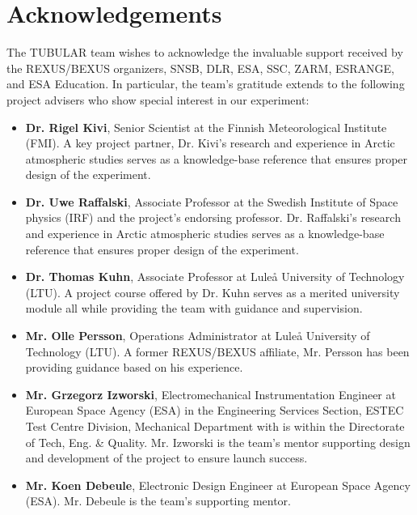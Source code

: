 \section*{Acknowledgements} \markboth{}{}

The TUBULAR team wishes to acknowledge the invaluable support received by the REXUS/BEXUS organizers, SNSB, DLR, ESA, SSC, ZARM, ESRANGE, and ESA Education. In particular, the team's gratitude extends to the following project advisers who show special interest in our experiment:

\begin{itemize}
  \item \textbf{Dr. Rigel Kivi}, Senior Scientist at the Finnish Meteorological Institute (FMI). A key project partner, Dr. Kivi's research and experience in Arctic atmospheric studies serves as a knowledge-base reference that ensures proper design of the experiment.
  \item \textbf{Dr. Uwe Raffalski}, Associate Professor at the Swedish Institute of Space physics (IRF) and the project's endorsing professor. Dr. Raffalski's research and experience in Arctic atmospheric studies serves as a knowledge-base reference that ensures proper design of the experiment.
  \item \textbf{Dr. Thomas Kuhn}, Associate Professor at Luleå  University of Technology (LTU). A project course offered by Dr. Kuhn serves as a merited university module all while providing the team with guidance and supervision.
  \item \textbf{Mr. Olle Persson}, Operations Administrator at Luleå University of Technology (LTU). A former REXUS/BEXUS affiliate, Mr. Persson has been providing guidance based on his experience.
  \item \textbf{Mr. Grzegorz Izworski}, Electromechanical Instrumentation Engineer at European Space Agency (ESA) in the Engineering Services Section, ESTEC Test Centre Division, Mechanical Department with is within the Directorate of Tech, Eng. & Quality. Mr. Izworski is the team's mentor supporting design and development of the project to ensure launch success.
  \item \textbf{Mr. Koen Debeule}, Electronic Design Engineer at European Space Agency (ESA). Mr. Debeule is the team's supporting mentor.
\end{itemize}
